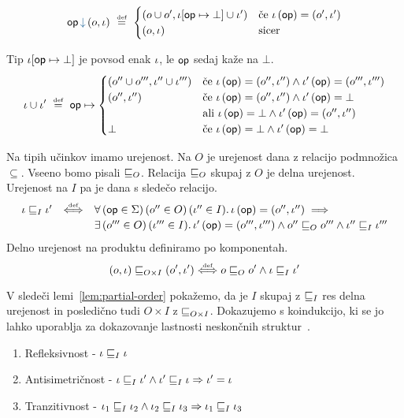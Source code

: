 $$\opincomp{op}{(\o, \i)}~\defeq~
\begin{cases}
	\left(\o \cup \o' , \i[\op \mapsto \bot] \cup \i' \right) & \mbox{če } \i\, (\op) = (\o',\i')\\
	(\o,\i) & \mbox{sicer} 
\end{cases}$$

Tip $\iota[\mathsf{op} \mapsto \bot]$ je povsod enak $\iota$, le $\mathsf{op}$ sedaj kaže na $\bot$.
$$
\iota \cup \iota'
~\mathrel{\overset{\text{\tiny def}}{=}}~
\mathsf{op} \mapsto 
\begin{cases}
	(o'' \cup o''' , \iota'' \cup \iota''') & \mbox{če } \iota\, (\mathsf{op}) = (o'',\iota'') \wedge \iota'\, (\mathsf{op}) = (o''',\iota''') \\
	(o'' , \iota'') & \mbox{če } \iota\, (\mathsf{op}) = (o'',\iota'') \wedge \iota'\, (\mathsf{op}) = \bot \\
	              & \mbox{ali } \iota\, (\mathsf{op}) = \bot \wedge \iota'\, (\mathsf{op}) = (o'',\iota'') \\
	\bot & \mbox{če } \iota\, (\mathsf{op}) = \bot \wedge \iota'\, (\mathsf{op}) = \bot \\
\end{cases}
$$

Na tipih učinkov imamo urejenost. Na $O$ je urejenost dana z relacijo podmnožica $\subseteq$. Vseeno bomo pisali $\sqsubseteq_{O}$. Relacija $\sqsubseteq_{O}$ skupaj z $O$ je delna urejenost.
Urejenost na $I$ pa je dana s sledečo relacijo.
$$
\begin{array}{l c l}
	\iota \sqsubseteq_{I} \iota'
	&
	\mathrel{\overset{\text{\tiny def}}{\Longleftrightarrow}}
	&
	\forall\, (\mathsf{op} \in \Sigma) \, (o'' \in O) \, (\iota'' \in I) .\, \iota\, (\mathsf{op}) = ({o''} , {\iota''}) \implies 
	\\[0.5ex]
	&& \exists\, (o''' \in O) \, (\iota''' \in I) .\, \iota'\, (\mathsf{op}) = ({o'''} , {\iota'''}) \wedge o'' \sqsubseteq_{O} o''' \wedge \iota'' \sqsubseteq_{I} \iota'''
\end{array}
$$
Delno urejenost na produktu definiramo po komponentah.
$$(o, \iota) \sqsubseteq_{O \times I} (o', \iota') \mathrel{\overset{\text{\tiny def}}{\Longleftrightarrow}} o \sqsubseteq_{O} o' \wedge \iota \sqsubseteq_{I} \iota'$$

V sledeči lemi~\ref{lem:partial-order} pokažemo, da je $I$ skupaj z $\sqsubseteq_{I}$ res delna urejenost in posledično tudi $O \times I$ z $\sqsubseteq_{O \times I}$.
Dokazujemo s koindukcijo, ki se jo lahko uporablja za dokazovanje lastnosti neskončnih struktur~\cite{coinduction,slak}. 


\begin{lema}\label{lem:partial-order}
	\begin{enumerate}
		\item Refleksivnost - $\iota \sqsubseteq_{I} \iota$
		\item Antisimetričnost - $\iota \sqsubseteq_{I} \iota' \wedge \iota' \sqsubseteq_{I} \iota \Rightarrow \iota' = \iota$
		\item Tranzitivnost - $\iota_1 \sqsubseteq_{I} \iota_2 \wedge \iota_2 \sqsubseteq_{I} \iota_3 \Rightarrow \iota_1 \sqsubseteq_{I} \iota_3$
	\end{enumerate}
\end{lema}

